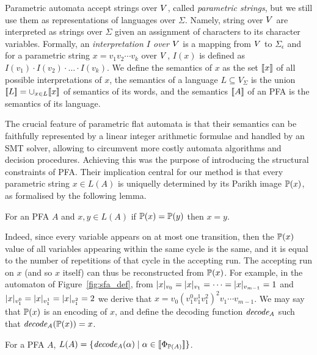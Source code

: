 \documentclass[sigplan,review,anonymous]{acmart}\settopmatter{printfolios=true,printccs=false,printacmref=false}
\begin{document}
Parametric automata accept strings over $V$, called \emph{parametric strings}, but we still use them as representations of languages over $\Sigma$. 
%
Namely, string over $V$ are interpreted as strings over $\Sigma$ given an assignment of characters to its character variables.  
%
Formally, an \emph{interpretation $I$ over $V$} is a mapping from $V$ to $\Sigma_\epsilon$ and for a parametric string $x= v_1v_2\cdots v_k$ over $V$, $I(x)$ is defined as $I(v_1)\cdot I(v_2)\cdot \ldots \cdot I(v_k)$.
%
We define the semantics of $x$ as the set $[\![x]\!]$ of all possible interpretations of $x$, the semantics of a language $L\subseteq V_\Sigma$ is the union $[\![L]\!] = \cup_{x\in L} [\![x]\!]$ of semantics of its words, and the semantics $[\![A]\!]$ of an PFA is the semantics of its language. 

The crucial feature of parametric flat automata is that their semantics can be faithfully represented by a linear integer arithmetic formulae and handled by an SMT solver, allowing to circumvent more costly automata algorithms and decision procedures. 
%
Achieving this was the purpose of introducing the structural constraints of PFA. 
Their implication central for our method is that every parametric string $x\in L(A)$ is uniquelly determined by its Parikh image $\mathbb{P}{(x)}$, as formalised by the following lemma.  

\begin{lemma}\label{lemma:parikh}
For an PFA $A$ and $x,y\in L(A)$ if $\mathbb{P}{(x)} = \mathbb{P}{(y)}$ then $x = y$. 
\end{lemma}
%
Indeed, since every variable appears on at most one transition, then the $\mathbb{P}{(x)}$ value of all variables appearing within the same cycle is the same, and it is equal to the number of repetitions of that cycle in the accepting run. 
%
The accepting run on $x$ (and so $x$ itself) can thus be reconstructed from $\mathbb{P}{(x)}$. 
%
For example, in the automaton of Figure~\ref{fig:sfa_def}, 
from $|x|_{v_0} = |x|_{v_1} = \cdots = |x|_{v_{m-1}}=1$ and $|x|_{v^0_1}=|x|_{v^1_1}=|x|_{v^2_1}=2$ we derive that $x=v_0(v^0_1v^1_1v^2_1)^2v_1\cdots v_{m-1}$. 
We may say that $\mathbb{P}{(x)}$ is an encoding of $x$, and define the decoding function $\mathit{decode_{A}}$ such that $\mathit{decode_{A}}(\mathbb{P}{(x)}) = x$.

\begin{lemma}\label{lemma:decx}
For a PFA $A$, $L(A) = \{\mathit{decode_{A}}(\alpha) \mid \alpha\in[\![\Phi_{\mathbb{P}{(A)}}]\!]\}$.
\end{lemma}
\end{document}
